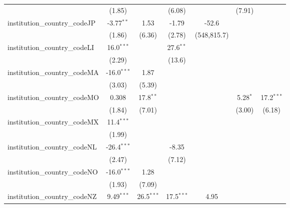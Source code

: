 \begin{tabular}{lcccccc}
                                         & (1.85)        &               & (6.08)        &               & (7.91)        &   \\   
   institution\_country\_codeJP          & -3.77$^{**}$  & 1.53          & -1.79         & -52.6         &               &   \\   
                                         & (1.86)        & (6.36)        & (2.78)        & (548,815.7)   &               &   \\   
   institution\_country\_codeLI          & 16.0$^{***}$  &               & 27.6$^{**}$   &               &               &   \\   
                                         & (2.29)        &               & (13.6)        &               &               &   \\   
   institution\_country\_codeMA          & -16.0$^{***}$ & 1.87          &               &               &               &   \\   
                                         & (3.03)        & (5.39)        &               &               &               &   \\   
   institution\_country\_codeMO          & 0.308         & 17.8$^{**}$   &               &               & 5.28$^{*}$    & 17.2$^{***}$\\   
                                         & (1.84)        & (7.01)        &               &               & (3.00)        & (6.18)\\   
   institution\_country\_codeMX          & 11.4$^{***}$  &               &               &               &               &   \\   
                                         & (1.99)        &               &               &               &               &   \\   
   institution\_country\_codeNL          & -26.4$^{***}$ &               & -8.35         &               &               &   \\   
                                         & (2.47)        &               & (7.12)        &               &               &   \\   
   institution\_country\_codeNO          & -16.0$^{***}$ & 1.28          &               &               &               &   \\   
                                         & (1.93)        & (7.09)        &               &               &               &   \\   
   institution\_country\_codeNZ          & 9.49$^{***}$  & 26.5$^{***}$  & 17.5$^{***}$  & 4.95          &               &   \\   

\end{tabular}
